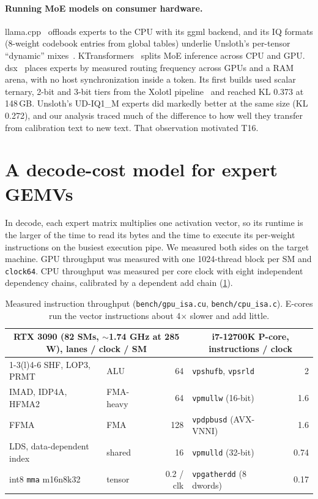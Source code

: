 \documentclass[10pt]{article}
\begin{document}
\paragraph{Running MoE models on consumer hardware.}
llama.cpp~\cite{llamacpp} offloads experts to the CPU with its ggml backend, and its IQ formats (8-weight codebook
entries from global tables) underlie Unsloth's per-tensor ``dynamic'' mixes~\cite{unsloth}. KTransformers~\cite{ktransformers}
splits MoE inference across CPU and GPU. dsx~\cite{dsx} places experts by measured routing frequency across GPUs and a
RAM arena, with no host synchronization inside a token. Its first builds used scalar ternary, 2-bit and 3-bit tiers from
the Xolotl pipeline~\cite{xolotl} and reached KL 0.373 at 148\,GB. Unsloth's UD-IQ1\_M experts did markedly better at
the same size (KL 0.272), and our analysis traced much of the difference to how well they transfer from calibration
text to new text. That observation
motivated T16.

\section{A decode-cost model for expert GEMVs}
\label{sec:cost}

In decode, each expert matrix multiplies one activation vector, so its runtime is the larger of the time to read its
bytes and the time to execute its per-weight instructions on the busiest execution pipe. We measured both sides on the
target machine. GPU throughput was measured with one 1024-thread block per SM and \texttt{clock64}. CPU throughput was
measured per core clock with eight independent dependency chains, calibrated by a dependent add chain
(\cref{tab:isa}).

\begin{table}[t]
\centering\small
\begin{tabular}{@{}llr@{\hspace{2em}}llr@{}}
\toprule
\multicolumn{3}{c}{RTX 3090 (82 SMs, $\sim$1.74 GHz at 285 W), lanes / clock / SM} & \multicolumn{3}{c}{i7-12700K P-core, instructions / clock} \\
\cmidrule(r){1-3}\cmidrule(l){4-6}
SHF, LOP3, PRMT & ALU & 64 & \texttt{vpshufb}, \texttt{vpsrld} & & 2 \\
IMAD, IDP4A, HFMA2 & FMA-heavy & 64 & \texttt{vpmullw} (16-bit) & & 1.6 \\
FFMA & FMA & 128 & \texttt{vpdpbusd} (AVX-VNNI) & & 1.6 \\
LDS, data-dependent index & shared & 16 & \texttt{vpmulld} (32-bit) & & 0.74 \\
int8 \texttt{mma} m16n8k32 & tensor & 0.2 / clk & \texttt{vpgatherdd} (8 dwords) & & 0.17 \\
\bottomrule
\end{tabular}
\caption{Measured instruction throughput (\texttt{bench/gpu\_isa.cu}, \texttt{bench/cpu\_isa.c}). E-cores run the
vector instructions about 4$\times$ slower and add little.}
\label{tab:isa}
\end{table}
\end{document}
